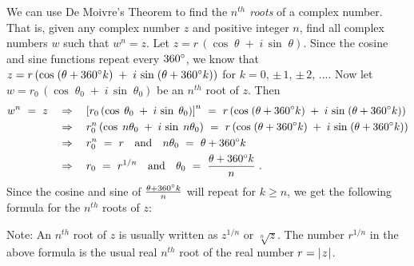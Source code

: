 We can use De Moivre's Theorem to find the \emph{$n^{th}$ roots} of a complex number. That is, given any
complex number $z$ and positive integer $n$, find all complex numbers $w$ such that $w^n = z$.
Let $z=r\,(\cos\;\theta \;+\; i\,\sin\;\theta)$. Since the cosine and sine functions repeat every
$360^\circ$, we know that
$z=r\,(\cos\;(\theta + 360^\circ k)\;+\; i\,\sin\;(\theta + 360^\circ k))$ for $k=0$, $\pm\,1$,
$\pm\,2$, $...$. Now let $w=r_0 \,(\cos\;\theta_0 \;+\; i\,\sin\;\theta_0 )$ be an $n^{th}$ root of
$z$. Then
\begin{align*}
 w^n ~=~ z \quad&\Rightarrow\quad \left[ r_0 \,(\cos\;\theta_0 \;+\; i\,\sin\;\theta_0 )\right]^n
  ~=~ r\,(\cos\;(\theta + 360^\circ k)\;+\; i\,\sin\;(\theta + 360^\circ k))\\
 &\Rightarrow\quad r_0^n \,(\cos\;n\theta_0 \;+\; i\,\sin\;n\theta_0 )
  ~=~ r\,(\cos\;(\theta + 360^\circ k)\;+\; i\,\sin\;(\theta + 360^\circ k))\\
 &\Rightarrow\quad r_0^n ~=~ r \quad\text{and}\quad n\theta_0 ~=~ \theta + 360^\circ k\\
 &\Rightarrow\quad r_0 ~=~ r^{1/n} \quad\text{and}\quad \theta_0 ~=~
  \frac{\theta + 360^\circ k}{n} ~.
\end{align*}
Since the cosine and sine of $\frac{\theta + 360^\circ k}{n}$ will repeat for $k \ge n$, we get
the following formula for the $n^{th}$ roots of $z$:

\begin{center}\end{center}

\noindent Note: An $n^{th}$ root of $z$ is usually written as $z^{1/n}$ or $\sqrt[n]{z}$. The number
$r^{1/n}$ in the above formula is the usual real $n^{th}$ root of the real number $r=\lvert\mspace{1mu}z\mspace{1mu}\rvert$.


